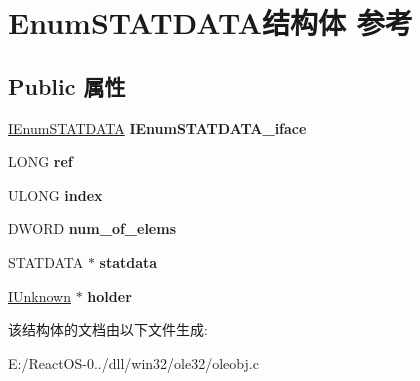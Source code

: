 \hypertarget{struct_enum_s_t_a_t_d_a_t_a}{}\section{Enum\+S\+T\+A\+T\+D\+A\+T\+A结构体 参考}
\label{struct_enum_s_t_a_t_d_a_t_a}
\subsection*{Public 属性}
\begin{DoxyCompactItemize}
\item 
\mbox{\label{struct_enum_s_t_a_t_d_a_t_a_a84d0d888b1ad12a5fcaf2fb7d55f64c0}} 
\hyperlink{interface_i_enum_s_t_a_t_d_a_t_a}{I\+Enum\+S\+T\+A\+T\+D\+A\+TA} {\bfseries I\+Enum\+S\+T\+A\+T\+D\+A\+T\+A\+\_\+iface}
\item 
\mbox{\label{struct_enum_s_t_a_t_d_a_t_a_accfe944fe43a85be1603ac7b4160020c}} 
L\+O\+NG {\bfseries ref}
\item 
\mbox{\label{struct_enum_s_t_a_t_d_a_t_a_a60e4e5a5d241a8e381b4620da04a125c}} 
U\+L\+O\+NG {\bfseries index}
\item 
\mbox{\label{struct_enum_s_t_a_t_d_a_t_a_a4ab673ff687e08b5f0e1ef73283183ba}} 
D\+W\+O\+RD {\bfseries num\+\_\+of\+\_\+elems}
\item 
\mbox{\label{struct_enum_s_t_a_t_d_a_t_a_a405fca87df4d6cb1bb2531e6d0986db2}} 
S\+T\+A\+T\+D\+A\+TA $\ast$ {\bfseries statdata}
\item 
\mbox{\label{struct_enum_s_t_a_t_d_a_t_a_ac9b452753b65b4a94692fcbc1a894e7c}} 
\hyperlink{interface_i_unknown}{I\+Unknown} $\ast$ {\bfseries holder}
\end{DoxyCompactItemize}


该结构体的文档由以下文件生成\+:\begin{DoxyCompactItemize}
\item 
E\+:/\+React\+O\+S-\/0../dll/win32/ole32/oleobj.\+c\end{DoxyCompactItemize}
